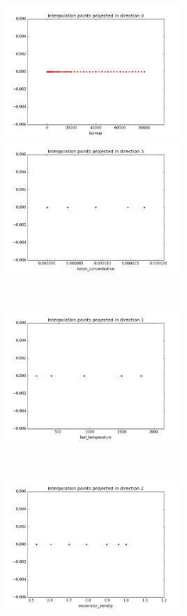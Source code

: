 \begin{center}
\begin{figure}[!h]
    \centering
    \begin{subfigure}[b]{0.3\textwidth}
				\includegraphics[width=\linewidth,height=5cm]{images/MOX/interpolation_points_0_macro_totale0.png}
				\includegraphics[width=\linewidth,height=5cm]{images/MOX/interpolation_points_3_macro_totale0.png}
    \end{subfigure}
		~
    \begin{subfigure}[b]{0.3\textwidth}
        \includegraphics[width=\linewidth,height=5cm]{images/MOX/interpolation_points_1_macro_totale0.png}
    \end{subfigure}
		~
		\begin{subfigure}[b]{0.3\textwidth}
				\includegraphics[width=\linewidth,height=5cm]{images/MOX/interpolation_points_2_macro_totale0.png}

\end{subfigure}
\end{figure}
\end{center}
